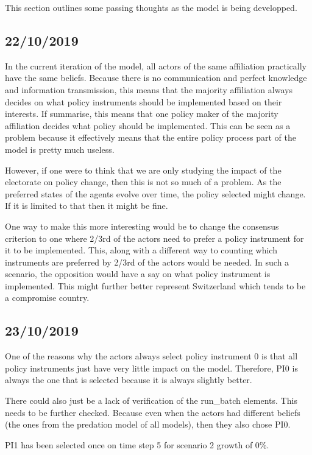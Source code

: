 This section outlines some passing thoughts as the model is being developped.

\subsection{22/10/2019}

In the current iteration of the model, all actors of the same affiliation practically have the same beliefs. Because there is no communication and perfect knowledge and information transmission, this means that the majority affiliation always decides on what policy instruments should be implemented based on their interests. If summarise, this means that one policy maker of the majority affiliation decides what policy should be implemented. This can be seen as a problem because it effectively means that the entire policy process part of the model is pretty much useless.

However, if one were to think that we are only studying the impact of the electorate on policy change, then this is not so much of a problem. As the preferred states of the agents evolve over time, the policy selected might change. If it is limited to that then it might be fine.

One way to make this more interesting would be to change the consensus criterion to one where 2/3rd of the actors need to prefer a policy instrument for it to be implemented. This, along with a different way to counting which instruments are preferred by 2/3rd of the actors would be needed. In such a scenario, the opposition would have a say on what policy instrument is implemented. This might further better represent Switzerland which tends to be a compromise country.

\subsection{23/10/2019}

One of the reasons why the actors always select policy instrument 0 is that all policy instruments just have very little impact on the model. Therefore, PI0 is always the one that is selected because it is always slightly better.

There could also just be a lack of verification of the run\_batch elements. This needs to be further checked. Because even when the actors had different beliefs (the ones from the predation model of all models), then they also chose PI0.

PI1 has been selected once on time step 5 for scenario 2 growth of 0\%.

